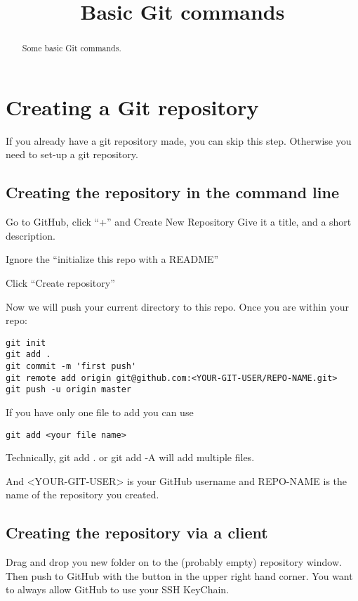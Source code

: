 \documentclass{ximera}
\title{Basic Git commands}
\begin{document}
\begin{abstract}
  Some basic Git commands.
\end{abstract}
\maketitle

\section{Creating a Git repository}

If you already have a git repository made, you can skip this
step. Otherwise you need to set-up a git repository.



\subsection{Creating the repository in the command line}

Go to GitHub, click ``+'' and Create New Repository Give it a title,
and a short description.

Ignore the ``initialize this repo with a README''

Click ``Create repository''

Now we will push your current directory to this repo. Once you are within your repo:

\begin{verbatim}
git init
git add .
git commit -m 'first push'
git remote add origin git@github.com:<YOUR-GIT-USER/REPO-NAME.git>
git push -u origin master
\end{verbatim}

If you have only one file to add you can use 
\begin{verbatim}
git add <your file name>
\end{verbatim}

Technically, git add . or git add -A will add multiple files.

And <YOUR-GIT-USER> is your GitHub username and REPO-NAME is the name
of the repository you created.


\subsection{Creating the repository via a client}

Drag and drop you new folder on to the (probably empty) repository
window. Then push to GitHub with the button in the upper right hand
corner. You want to always allow GitHub to use your SSH KeyChain.
\end{document}
